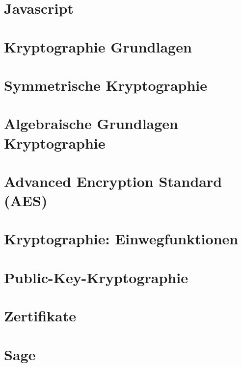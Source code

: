 \documentclass{scrreprt}
\begin{document}
\chapter{Javascript}


\chapter{Kryptographie Grundlagen}


\chapter{Symmetrische Kryptographie}


\chapter{Algebraische Grundlagen Kryptographie}


\chapter{Advanced Encryption Standard (AES)}


\chapter{Kryptographie: Einwegfunktionen}


\chapter{Public-Key-Kryptographie}


\chapter{Zertifikate}


\chapter{Sage}

\end{document}
